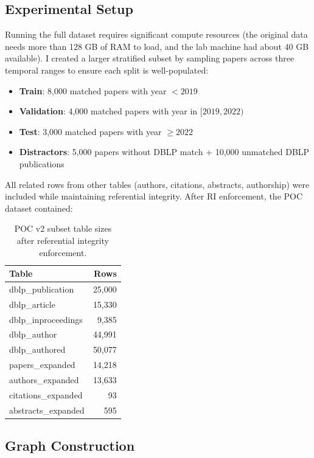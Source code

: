 \documentclass{article}
\begin{document}
\subsection{Experimental Setup}

Running the full dataset requires significant compute resources (the original data needs more than 128 GB of RAM to load, and the lab machine had about 40 GB available).
I created a larger stratified subset by sampling papers across three temporal ranges to ensure each split is well-populated:

\begin{itemize}
    \item \textbf{Train}: 8,000 matched papers with year $< 2019$
    \item \textbf{Validation}: 4,000 matched papers with year in $[2019, 2022)$
    \item \textbf{Test}: 3,000 matched papers with year $\geq 2022$
    \item \textbf{Distractors}: 5,000 papers without DBLP match + 10,000 unmatched DBLP publications
\end{itemize}

All related rows from other tables (authors, citations, abstracts, authorship) were included while maintaining referential integrity. After RI enforcement, the POC dataset contained:

\begin{table}[h!]
\centering
\caption{POC v2 subset table sizes after referential integrity enforcement.}
\label{tab:poc}
\begin{tabular}{lr}
\toprule
\textbf{Table} & \textbf{Rows} \\
\midrule
dblp\_publication & 25,000 \\
dblp\_article & 15,330 \\
dblp\_inproceedings & 9,385 \\
dblp\_author & 44,991 \\
dblp\_authored & 50,077 \\
papers\_expanded & 14,218 \\
authors\_expanded & 13,633 \\
citations\_expanded & 93 \\
abstracts\_expanded & 595 \\
\bottomrule
\end{tabular}
\end{table}

\subsection{Graph Construction}
\end{document}
